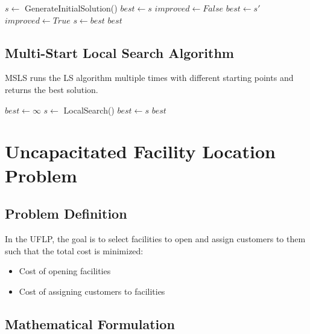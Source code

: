\documentclass[12pt,a4paper]{article}
\begin{document}
\begin{algorithm}
\caption{Local Search for Graph Coloring}
\begin{algorithmic}[1]
\State $s \gets$ GenerateInitialSolution()
\State $best \gets s$
\Repeat
    \State $improved \gets False$
            \State $best \gets s'$
            \State $improved \gets True$
        \EndIf
    \EndFor
    \State $s \gets best$
\State \Return $best$
\end{algorithmic}
\end{algorithm}

\subsection{Multi-Start Local Search Algorithm}

MSLS runs the LS algorithm multiple times with different starting points and returns the best solution.

\begin{algorithm}
\caption{Multi-Start Local Search}
\begin{algorithmic}[1]
\State $best \gets \infty$
    \State $s \gets$ LocalSearch()
        \State $best \gets s$
    \EndIf
\EndFor
\State \Return $best$
\end{algorithmic}
\end{algorithm}

\section{Uncapacitated Facility Location Problem}

\subsection{Problem Definition}

In the UFLP, the goal is to select facilities to open and assign customers to them such that the total cost is minimized:
\begin{itemize}
    \item Cost of opening facilities
    \item Cost of assigning customers to facilities
\end{itemize}

\subsection{Mathematical Formulation}
\end{document}
